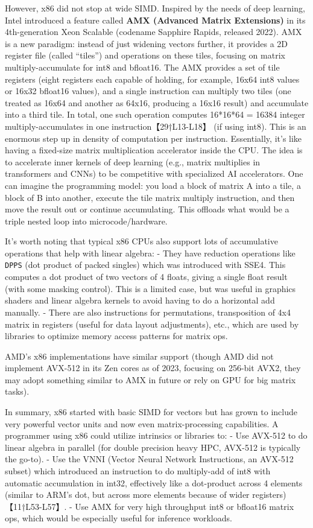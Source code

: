 However, x86 did not stop at wide SIMD. Inspired by the needs of deep learning, Intel introduced a feature called \textbf{AMX (Advanced Matrix Extensions)} in its 4th-generation Xeon Scalable (codename Sapphire Rapids, released 2022). AMX is a new paradigm: instead of just widening vectors further, it provides a 2D register file (called “tiles”) and operations on these tiles, focusing on matrix multiply-accumulate for int8 and bfloat16. The AMX provides a set of tile registers (eight registers each capable of holding, for example, 16x64 int8 values or 16x32 bfloat16 values), and a single instruction can multiply two tiles (one treated as 16x64 and another as 64x16, producing a 16x16 result) and accumulate into a third tile. In total, one such operation computes 16*16*64 = 16384 integer multiply-accumulates in one instruction【29†L13-L18】 (if using int8). This is an enormous step up in density of computation per instruction. Essentially, it’s like having a fixed-size matrix multiplication accelerator inside the CPU. The idea is to accelerate inner kernels of deep learning (e.g., matrix multiplies in transformers and CNNs) to be competitive with specialized AI accelerators. One can imagine the programming model: you load a block of matrix A into a tile, a block of B into another, execute the tile matrix multiply instruction, and then move the result out or continue accumulating. This offloads what would be a triple nested loop into microcode/hardware.

It’s worth noting that typical x86 CPUs also support lots of accumulative operations that help with linear algebra:
- They have reduction operations like \texttt{DPPS} (dot product of packed singles) which was introduced with SSE4. This computes a dot product of two vectors of 4 floats, giving a single float result (with some masking control). This is a limited case, but was useful in graphics shaders and linear algebra kernels to avoid having to do a horizontal add manually.
- There are also instructions for permutations, transposition of 4x4 matrix in registers (useful for data layout adjustments), etc., which are used by libraries to optimize memory access patterns for matrix ops.

AMD’s x86 implementations have similar support (though AMD did not implement AVX-512 in its Zen cores as of 2023, focusing on 256-bit AVX2, they may adopt something similar to AMX in future or rely on GPU for big matrix tasks).

In summary, x86 started with basic SIMD for vectors but has grown to include very powerful vector units and now even matrix-processing capabilities. A programmer using x86 could utilize intrinsics or libraries to:
- Use AVX-512 to do linear algebra in parallel (for double precision heavy HPC, AVX-512 is typically the go-to).
- Use the VNNI (Vector Neural Network Instructions, an AVX-512 subset) which introduced an instruction to do multiply-add of int8 with automatic accumulation in int32, effectively like a dot-product across 4 elements (similar to ARM’s dot, but across more elements because of wider registers)【11†L53-L57】.
- Use AMX for very high throughput int8 or bfloat16 matrix ops, which would be especially useful for inference workloads. 

